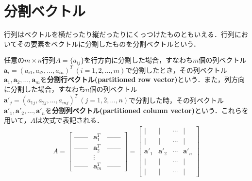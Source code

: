 \section{分割ベクトル}
行列はベクトルを横だったり縦だったりにくっつけたものともいえる．行列においてその要素をベクトルに分割したものを分割ベクトルという．

\begin{defi}[分割ベクトル]
任意の$m\times n$行列$A=\{a_{ij}\}$を行方向に分割した場合，すなわち$m$個の列ベクトル${\bm a}_i=(a_{i1},a_{i2},\ldots,a_{in})^T~(i=1,2,\ldots,m)$で分割したとき，その列ベクトル${\bm a}_1,{\bm a}_2,\ldots,{\bm a}_m$を{\bf 分割行ベクトル(partitioned row vector)}という．また，列方向に分割した場合，すなわち$n$個の列ベクトル${\bm a}'_j=(a_{1j},a_{2j},\ldots,a_{mj})^T~(j=1,2,\ldots,n)$で分割した時，その列ベクトル${\bm a}'_1,{\bm a}'_2,\ldots,{\bm a}'_n$を{\bf 分割列ベクトル(partitioned column vector)}という．これらを用いて，$A$は次式で表記される．
\begin{align}
A=
\begin{bmatrix}
\mbox{------} & {\bm a}_1^T & \mbox{------} \\
\mbox{------} & {\bm a}_2^T & \mbox{------} \\
 & \vdots & \\
\mbox{------} & {\bm a}_m^T & \mbox{------}
\end{bmatrix}	
=
\begin{bmatrix}
| & | & \cdots & | \\[-2pt]
| & | & \cdots & | \\
{\bm a}'_1 & {\bm a}'_2 & \cdots & {\bm a}'_n \\
| & | & \cdots & |	\\[-2pt]
| & | & \cdots & |
\end{bmatrix}
\end{align}
\end{defi}


